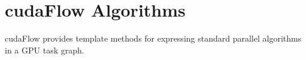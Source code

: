 \chapter{cuda\+Flow Algorithms}
\hypertarget{cuda_flow_algorithms}{}\label{cuda_flow_algorithms}
cuda\+Flow provides template methods for expressing standard parallel algorithms in a GPU task graph.


\begin{DoxyItemize}
\item {}
\item {}
\item {} 
\end{DoxyItemize}


